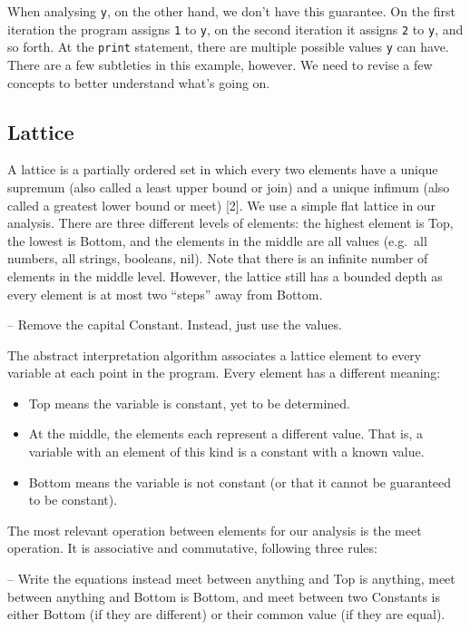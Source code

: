 \documentclass[
]{article}
\providecommand{\tightlist}{%
  \setlength{\itemsep}{0pt}\setlength{\parskip}{0pt}}
\begin{document}
When analysing \texttt{y}, on the other hand, we don't have this
guarantee. On the first iteration the program assigns \texttt{1} to
\texttt{y}, on the second iteration it assigns \texttt{2} to \texttt{y},
and so forth. At the \texttt{print} statement, there are multiple
possible values \texttt{y} can have. There are a few subtleties in this
example, however. We need to revise a few concepts to better understand
what's going on.

\hypertarget{lattice}{%
\subsection{Lattice}\label{lattice}}

A lattice is a partially ordered set in which every two elements have a
unique supremum (also called a least upper bound or join) and a unique
infimum (also called a greatest lower bound or meet) {[}2{]}. We use a
simple flat lattice in our analysis. There are three different levels of
elements: the highest element is Top, the lowest is Bottom, and the
elements in the middle are all values (e.g.~all numbers, all strings,
booleans, nil). Note that there is an infinite number of elements in the
middle level. However, the lattice still has a bounded depth as every
element is at most two ``steps'' away from Bottom.

-- Remove the capital Constant. Instead, just use the values.

The abstract interpretation algorithm associates a lattice element to
every variable at each point in the program. Every element has a
different meaning:

\begin{itemize}
\tightlist
\item
  Top means the variable is constant, yet to be determined.
\item
  At the middle, the elements each represent a different value. That is,
  a variable with an element of this kind is a constant with a known
  value.
\item
  Bottom means the variable is not constant (or that it cannot be
  guaranteed to be constant).
\end{itemize}

The most relevant operation between elements for our analysis is the
meet operation. It is associative and commutative, following three
rules:

-- Write the equations instead meet between anything and Top is
anything, meet between anything and Bottom is Bottom, and meet between
two Constants is either Bottom (if they are different) or their common
value (if they are equal).
\end{document}
